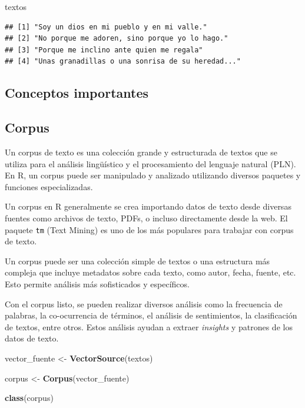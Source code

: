 \documentclass[
]{article}
\newenvironment{Shaded}{\begin{snugshade}}{\end{snugshade}}
\newcommand{\FunctionTok}[1]{\textcolor[rgb]{0.13,0.29,0.53}{\textbf{#1}}}
\newcommand{\NormalTok}[1]{#1}
\newcommand{\OtherTok}[1]{\textcolor[rgb]{0.56,0.35,0.01}{#1}}
\begin{document}
\begin{Shaded}
\begin{Highlighting}[]
\NormalTok{textos}
\end{Highlighting}
\end{Shaded}

\begin{verbatim}
## [1] "Soy un dios en mi pueblo y en mi valle."        
## [2] "No porque me adoren, sino porque yo lo hago."   
## [3] "Porque me inclino ante quien me regala"         
## [4] "Unas granadillas o una sonrisa de su heredad..."
\end{verbatim}

\hypertarget{conceptos-importantes}{%
\subsection{Conceptos importantes}\label{conceptos-importantes}}

\hypertarget{corpus}{%
\subsection{Corpus}\label{corpus}}

Un corpus de texto es una colección grande y estructurada de textos que
se utiliza para el análisis lingüístico y el procesamiento del lenguaje
natural (PLN). En R, un corpus puede ser manipulado y analizado
utilizando diversos paquetes y funciones especializadas.

Un corpus en R generalmente se crea importando datos de texto desde
diversas fuentes como archivos de texto, PDFs, o incluso directamente
desde la web. El paquete \texttt{tm} (Text Mining) es uno de los más
populares para trabajar con corpus de texto.

Un corpus puede ser una colección simple de textos o una estructura más
compleja que incluye metadatos sobre cada texto, como autor, fecha,
fuente, etc. Esto permite análisis más sofisticados y específicos.

Con el corpus listo, se pueden realizar diversos análisis como la
frecuencia de palabras, la co-ocurrencia de términos, el análisis de
sentimientos, la clasificación de textos, entre otros. Estos análisis
ayudan a extraer \emph{insights} y patrones de los datos de texto.

\begin{Shaded}
\begin{Highlighting}[]
\NormalTok{vector\_fuente }\OtherTok{\textless{}{-}} \FunctionTok{VectorSource}\NormalTok{(textos)}

\NormalTok{corpus }\OtherTok{\textless{}{-}} \FunctionTok{Corpus}\NormalTok{(vector\_fuente)}

\FunctionTok{class}\NormalTok{(corpus)}
\end{Highlighting}
\end{Shaded}
\end{document}
